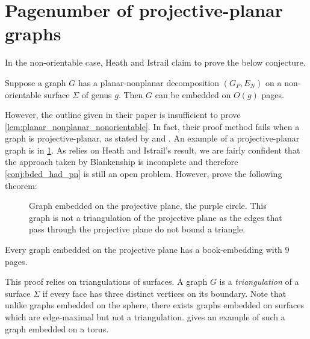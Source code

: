 
\section{Pagenumber of projective-planar graphs}
In the non-orientable case, Heath and Istrail claim to prove the below conjecture.
\begin{conjecture}\label{lem:planar_nonplanar_nonorientable}
	Suppose a graph \(G\) has a planar-nonplanar decomposition \((G_P, E_N)\) on a non-orientable surface \(\Sigma\) of genus $g$. Then \(G\) can be embedded on \( O(g)\) pages.
\end{conjecture}
However, the outline given in their paper is insufficient to prove \cref*{lem:planar_nonplanar_nonorientable}. In fact, their proof method fails when a graph is projective-planar, as stated by \textcite{nakamotoBookEmbeddingProjectiveplanar2015} and \textcite{ozekiBookEmbeddingGraphs2019}. An example of a projective-planar graph is in \cref{fig:projectiveplanar}. As \textcite{Blankenship-PhD03} relies on Heath and Istrail's result, we are fairly confident that the approach taken by Blankenship is incomplete and therefore \cref{conj:bded_had_pn} is still an open problem. However, \textcite{nakamotoBookEmbeddingProjectiveplanar2015} prove the following theorem:

\begin{figure}[h]
    \centering
    
    \caption[Projective planar graph]{Graph embedded on the projective plane, the purple circle. This graph is not a triangulation of the projective plane as the edges that pass through the projective plane do not bound a triangle.}\label{fig:projectiveplanar}\end{figure}

\begin{theorem}\label{thm:proj_planar_graphs_9pages}
	Every graph embedded on the projective plane has a book-embedding with $9$ pages.
\end{theorem}

This proof relies on triangulations of surfaces. A graph $G$ is a \textit{triangulation} of a surface $\Sigma$ if every face has three distinct vertices on its boundary. Note that unlike graphs embedded on the sphere, there exists graphs embedded on surfaces which are edge-maximal but not a triangulation. \textcite{hararyMaximalToroidalGraph1973} gives an example of such a graph embedded on a torus. 

